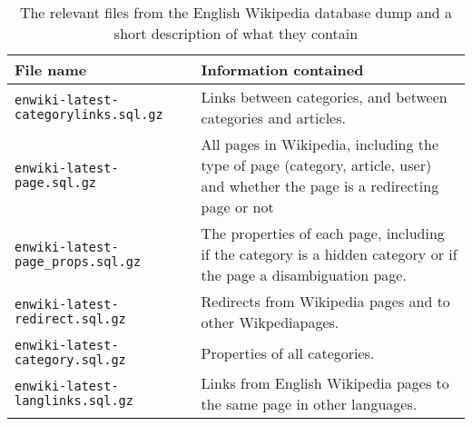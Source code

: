 



\begin{table}[ht]
\renewcommand{\arraystretch}{1.25}
\begin{tabularx}{\textwidth}{l|X}
\textbf{File name} & \textbf{Information contained}\\ \hline
\texttt{enwiki-latest-categorylinks.sql.gz} &  Links between categories, and between categories and articles. \\ \hline
\texttt{enwiki-latest-page.sql.gz} & All pages in Wikipedia, including the type of page (category, article, user) and whether the page is a redirecting page or not\\ \hline
\texttt{enwiki-latest-page\_props.sql.gz} & The properties of each page, including if the category is a hidden category or if the page a disambiguation page. \\ \hline
\texttt{enwiki-latest-redirect.sql.gz} & Redirects from Wikipedia pages and to other Wikpediapages. \\ \hline
\texttt{enwiki-latest-category.sql.gz} & Properties of all categories. \\ \hline
\texttt{enwiki-latest-langlinks.sql.gz} & Links from English Wikipedia pages to the same page in other languages.
\end{tabularx}
\\[10pt]
\caption[Relevant files from English Wikipedia database dump]{The relevant files from the English Wikipedia database dump and a short description of what they contain}
\label{tab:databasedumpfiles}
\end{table}

